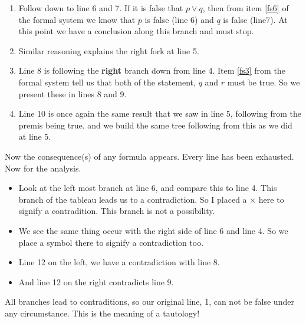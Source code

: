 \begin{example}
\begin{minipage}{0.65\textwidth}
\begin{enumerate}
\item Follow down to line 6 and 7.  If it is false that $p \lor q$, then from item \ref{fs6} of the formal system we know that $p$ is false (line 6) and $q$ is false (line7).  At this point we have a conclusion along this branch and must stop.
\item Similar reasoning explains the right  fork at line 5.
\item Line 8 is following the \textbf{right} branch down from line 4.  Item \ref{fs3} from the formal system tell us that both of the statement, $q$ and $r$ must be true.  So we present these in lines 8 and 9.
\item Line 10 is once again the same result that we saw in line 5, following from the premis being true.  and we build the same tree following from this as we did at line 5.
\end{enumerate}
Now the consequence(s) of any formula appears.  Every line has been exhausted.  Now for the analysis.

\begin{itemize}
\item Look at the left most branch at line 6, and compare this to line 4.  This branch of the tableau leads us to a contradiction. So I placed a $\times$ here to signify a contradition.  This branch is not a possibility.
\item We see the same thing occur with the right side of line 6 and line 4.  So we place a symbol there to signify a contradiction too.
\item Line 12 on the left, we have a contradiction with line 8.
\item And line 12 on the right contradicts line 9.
\end{itemize}
All branches lead to contraditions, so our original line, 1, can not be false under any circumstance.  This is the meaning of a tautology!  
\else
 \fi
\end{minipage}

\end{example}

\newpage
%
%

